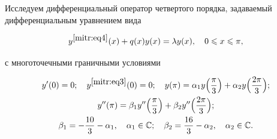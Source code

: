 



\date{}








\renewcommand{\JournalDataOnline}{\displaydate{mitre}}



\makerutitle



\newpage





 Исследуем дифференциальный оператор четвертого порядка, задаваемый дифференциальным уравнением вида

\begin{equation}

\label{mitr:eq1}

y^{\eqref{mitr:eq4}}(x)+q(x)y(x)=\lambda  y(x), \quad 

0\leqslant x\leqslant \pi,

\end{equation}

с многоточечными граничными условиями

\begin{equation}

\label{mitr:eq2}

\begin{gathered}

y'(0)=0; \quad  

y^{\eqref{mitr:eq3}}(0)=0; \quad 

y(\pi)=\alpha_1 y\Bigl(\frac\pi3\Bigr)+\alpha_2 y\Bigl(\frac{2\pi}3\Bigr); \\

y''(\pi)=\beta_1 y''\Bigl(\frac\pi3\Bigr)+\beta_2 y'' \Bigl(\frac{2\pi}3\Bigr);  \\ 

\beta_1=-\frac{10}3- \alpha_1, \quad  

\alpha_1\in\mathbb{C}; \quad  

\beta_2=\frac{16}3-\alpha_2, \quad  \alpha_2\in\mathbb{C}.

\end{gathered}

\end{equation}





